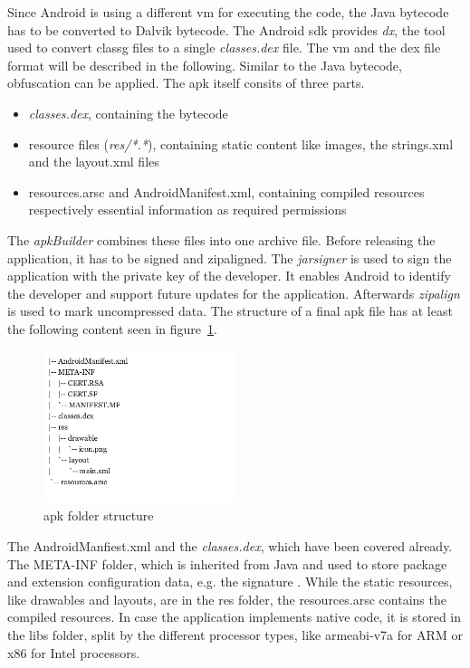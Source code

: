 \newline
Since Android is using a different \gls{vm} for executing the code, the Java bytecode has to be converted to Dalvik bytecode.
The Android \gls{sdk} provides \textit{dx}, the tool used to convert \gls{classg} files to a single \textit{classes.dex} file.
The \gls{vm} and the \gls{dex} file format will be described in the following.
Similar to the Java bytecode, obfuscation can be applied.
\newline
The \gls{apk} itself consits of three parts.
\begin{itemize}
\item \textit{classes.dex}, containing the bytecode
\item resource files (\textit{res/*.*}), containing static content like images, the strings.xml and the layout.xml files
\item resources.arsc and AndroidManifest.xml, containing compiled resources respectively essential information as required permissions
\end{itemize}
The \textit{apkBuilder} combines these files into one archive file. 
\newline
Before releasing the application, it has to be signed and zipaligned.
The \textit{jarsigner} is used to sign the application with the private key of the developer.
It enables Android to identify the developer and support future updates for the application.
Afterwards \textit{zipalign} is used to mark uncompressed data. \cite{androidPublishSign} \cite{andevconDalvikART}
\newline
\newline
The structure of a final \gls{apk} file has at least the following content seen in figure~\ref{fig:apkfolder}.
\begin{figure}[h]
    \centering
    \includegraphics[width=0.5\textwidth]{data/apkfolder.png}
    \caption{\gls{apk} folder structure}
    \label{fig:apkfolder}
\end{figure}
The AndroidManfiest.xml and the \textit{classes.dex}, which have been covered already.
The META-INF folder, which is inherited from Java and used to store package and extension configuration data, e.g. the signature \cite{metaJava}.
While the static resources, like drawables and layouts, are in the res folder, the resources.arsc contains the compiled resources.
In case the application implements native code, it is stored in the libs folder, split by the different processor types, like armeabi-v7a for ARM or x86 for Intel processors. \cite{kovachevaMaster} \cite{ehringerDalvik}
